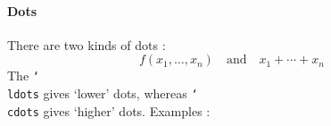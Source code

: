 \documentclass{article}
\newcommand\bSLASH{\char`\\}
\newcommand{\tab}{\hspace*{2cm}}
\begin{document}
\paragraph{Dots} There are two kinds of dots :
$$ f(x_1,\ldots,x_n) \quad \mbox{and} \quad x_1 +\cdots+x_n$$
The {\tt \bSLASH ldots} gives `lower' dots, whereas 
 {\tt \bSLASH cdots} gives `higher' dots. Examples :\\
\tab \tab \tab{\tt 
\$\$ f(x\_1,\bSLASH ldots,x\_n) \$\$}\\
\tab \tab \tab {\tt 
\$\$ x\_1 +\bSLASH cdots+x\_n \$\$
}
\end{document}
